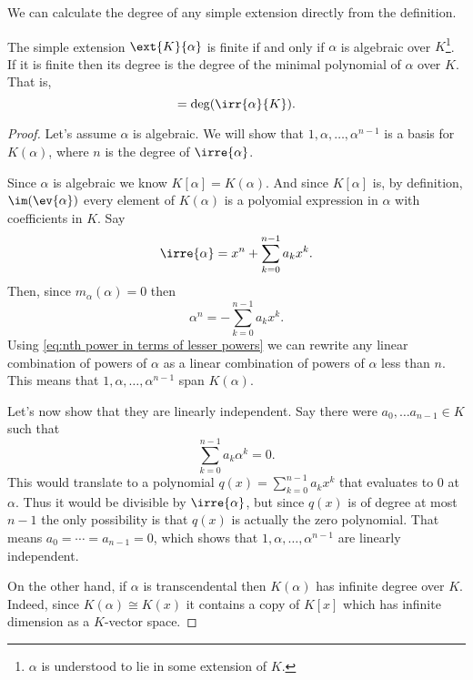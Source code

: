 \documentclass[12pt,oneside]{book}
\begin{document}
We can calculate the degree of any simple extension directly from the definition.
\begin{proposition} \label{prop:degree of a simple
	extension}
	The simple extension	\( \ext{K}{\alpha} \) is finite if and only if \( \alpha \) is
	algebraic over \( K \)\footnote{\( \alpha \) is understood to
	lie in some extension of \( K \).}. If it is finite then its degree is the degree of the
	minimal polynomial of \( \alpha \) over \( K \). That is,
	\begin{equation*}
		[K(\alpha) \colon K] = \deg(\irr{\alpha}{K}).
	\end{equation*}
\end{proposition}
\begin{proof}
	Let's assume \( \alpha \) is algebraic. We will show that \( 1, \alpha, \dots,
	\alpha^{n-1} \) is a basis for \( K(\alpha) \), where \( n \) is the degree of \(
	\irre{\alpha} \).

	Since \( \alpha \) is algebraic we know \( K[\alpha] = K(\alpha) \). And since \(
	K[\alpha]	\) is, by definition, \( \im(\ev{\alpha}) \) every element of \( K(\alpha) \)
	is a polyomial expression in \( \alpha \) with coefficients in \( K \). Say
	\begin{equation*}
		\irre{\alpha} = x^n + \sum_{k = 0}^{n-1}a_k x^k.
	\end{equation*}
	Then, since \( m_{\alpha}(\alpha) = 0 \) then
	\begin{equation} \label{eq:nth power in terms of lesser powers}
		\alpha^n = - \sum_{k = 0}^{n-1}a_k x^k.
	\end{equation}
	Using \cref{eq:nth power in terms of lesser powers} we can rewrite any linear combination
	of powers of \( \alpha \) as a linear combination of powers of \( \alpha \) less than \(
	n \). This means that \( 1, \alpha, \dots, \alpha^{n-1} \) span \( K(\alpha) \). 

	Let's now show that they are linearly independent. Say there were \( a_0, \dots a_{n-1}
	\in K \) such that
	\begin{equation*}
		\sum_{k = 0}^{n-1} a_k \alpha^k = 0.
	\end{equation*}
	This would translate to a polynomial \( q(x) = \sum_{k = 0}^{n-1} a_k x^k  \) that
	evaluates to \( 0 \) at \( \alpha \). Thus it would be divisible by \( \irre{\alpha} \),
	but since \( q(x) \) is of degree at most \( n-1 \) the only possibility is that \( q(x)
	\) is actually the zero polynomial. That means \( a_0 = \cdots = a_{n-1} = 0 \), which
	shows that \( 1, \alpha, \dots, \alpha^{n-1} \) are linearly independent.

	On the other hand, if \( \alpha \) is transcendental then \( K(\alpha) \) has infinite
	degree over \( K \). Indeed, since \( K(\alpha) \cong K(x) \) it contains a copy of \(
	K[x] \) which has infinite dimension as a \( K \)-vector space.
\end{proof}
\end{document}
